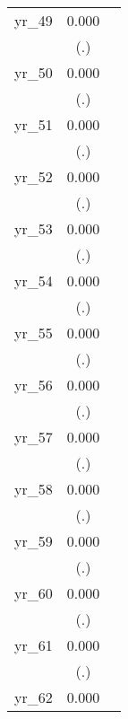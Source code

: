 \begin{table}[htbp]
\begin{tabular}{l*{2}{c}}
yr\_49       &       0.000         &                     \\
            &         (.)         &                     \\
yr\_50       &       0.000         &                     \\
            &         (.)         &                     \\
yr\_51       &       0.000         &                     \\
            &         (.)         &                     \\
yr\_52       &       0.000         &                     \\
            &         (.)         &                     \\
yr\_53       &       0.000         &                     \\
            &         (.)         &                     \\
yr\_54       &       0.000         &                     \\
            &         (.)         &                     \\
yr\_55       &       0.000         &                     \\
            &         (.)         &                     \\
yr\_56       &       0.000         &                     \\
            &         (.)         &                     \\
yr\_57       &       0.000         &                     \\
            &         (.)         &                     \\
yr\_58       &       0.000         &                     \\
            &         (.)         &                     \\
yr\_59       &       0.000         &                     \\
            &         (.)         &                     \\
yr\_60       &       0.000         &                     \\
            &         (.)         &                     \\
yr\_61       &       0.000         &                     \\
            &         (.)         &                     \\
yr\_62       &       0.000         &                     \\

\end{tabular}
\end{table}
